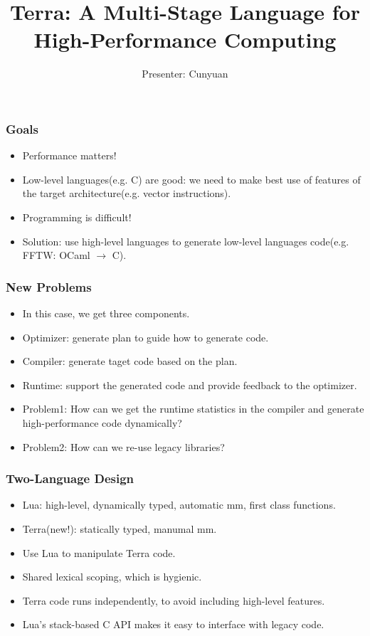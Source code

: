 \documentclass{beamer}
\begin{document}
\title{Terra: A Multi-Stage Language for High-Performance Computing}
\author{Presenter: Cunyuan}

\maketitle

\def\LArr{\xrightarrow[]{L}}
\def\SArr{\xrightarrow[]{S}}
\def\TArr{\xrightarrow[]{T}}
\def\ude#1{\underline{\dot{#1}}}

\begin{frame}
	\frametitle{Goals}
  \begin{itemize}
  \item Performance matters!\pause
  \item Low-level languages(e.g. C) are good: we need to make best use of features of the target architecture(e.g. vector instructions).\pause
  \item Programming is difficult!\pause
  \item Solution: use high-level languages to generate low-level languages code(e.g. FFTW: OCaml $\rightarrow$ C).
  \end{itemize}
\end{frame}

\begin{frame}
	\frametitle{New Problems}
  \begin{itemize}
  \item In this case, we get three components.\pause
  \item Optimizer: generate plan to guide how to generate code.\pause
  \item Compiler: generate taget code based on the plan.\pause
  \item Runtime: support the generated code and provide feedback to the optimizer.\pause
  \item Problem1: How can we get the runtime statistics in the compiler and generate high-performance code dynamically?\pause
  \item Problem2: How can we re-use legacy libraries?
  \end{itemize}
\end{frame}

\begin{frame}
  \frametitle{Two-Language Design}
  \begin{itemize}
  \item Lua: high-level, dynamically typed, automatic mm, first class functions.\pause
  \item Terra(new!): statically typed, manumal mm.\pause
  \item Use Lua to manipulate Terra code.\pause
  \item Shared lexical scoping, which is hygienic.\pause
  \item Terra code runs independently, to avoid including high-level features.\pause
  \item Lua's stack-based C API makes it easy to interface with legacy code.
  \end{itemize}
\end{frame}
\end{document}
